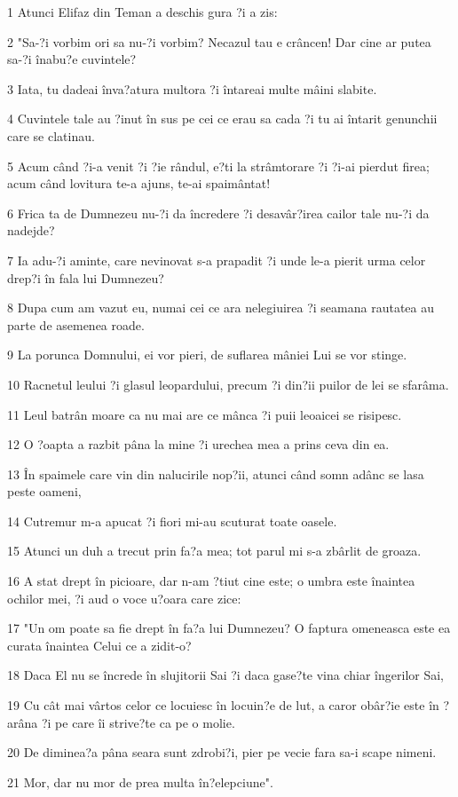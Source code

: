 \par 1 Atunci Elifaz din Teman a deschis gura ?i a zis:
\par 2 "Sa-?i vorbim ori sa nu-?i vorbim? Necazul tau e crâncen! Dar cine ar putea sa-?i înabu?e cuvintele?
\par 3 Iata, tu dadeai înva?atura multora ?i întareai multe mâini slabite.
\par 4 Cuvintele tale au ?inut în sus pe cei ce erau sa cada ?i tu ai întarit genunchii care se clatinau.
\par 5 Acum când ?i-a venit ?i ?ie rândul, e?ti la strâmtorare ?i ?i-ai pierdut firea; acum când lovitura te-a ajuns, te-ai spaimântat!
\par 6 Frica ta de Dumnezeu nu-?i da încredere ?i desavâr?irea cailor tale nu-?i da nadejde?
\par 7 Ia adu-?i aminte, care nevinovat s-a prapadit ?i unde le-a pierit urma celor drep?i în fala lui Dumnezeu?
\par 8 Dupa cum am vazut eu, numai cei ce ara nelegiuirea ?i seamana rautatea au parte de asemenea roade.
\par 9 La porunca Domnului, ei vor pieri, de suflarea mâniei Lui se vor stinge.
\par 10 Racnetul leului ?i glasul leopardului, precum ?i din?ii puilor de lei se sfarâma.
\par 11 Leul batrân moare ca nu mai are ce mânca ?i puii leoaicei se risipesc.
\par 12 O ?oapta a razbit pâna la mine ?i urechea mea a prins ceva din ea.
\par 13 În spaimele care vin din nalucirile nop?ii, atunci când somn adânc se lasa peste oameni,
\par 14 Cutremur m-a apucat ?i fiori mi-au scuturat toate oasele.
\par 15 Atunci un duh a trecut prin fa?a mea; tot parul mi s-a zbârlit de groaza.
\par 16 A stat drept în picioare, dar n-am ?tiut cine este; o umbra este înaintea ochilor mei, ?i aud o voce u?oara care zice:
\par 17 "Un om poate sa fie drept în fa?a lui Dumnezeu? O faptura omeneasca este ea curata înaintea Celui ce a zidit-o?
\par 18 Daca El nu se încrede în slujitorii Sai ?i daca gase?te vina chiar îngerilor Sai,
\par 19 Cu cât mai vârtos celor ce locuiesc în locuin?e de lut, a caror obâr?ie este în ?arâna ?i pe care îi strive?te ca pe o molie.
\par 20 De diminea?a pâna seara sunt zdrobi?i, pier pe vecie fara sa-i scape nimeni.
\par 21 Mor, dar nu mor de prea multa în?elepciune".

